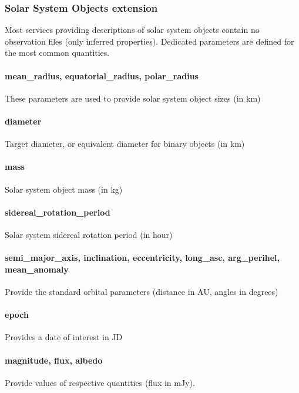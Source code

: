 \documentclass[11pt,a4paper]{ivoa}
\begin{document}
\subsubsection{Solar System Objects extension}

Most services providing descriptions of solar system objects contain
no observation files (only inferred properties).
Dedicated parameters are defined for the most common quantities.

\paragraph{mean\_radius, equatorial\_radius, polar\_radius}

These parameters are used to provide solar system object sizes (in km)

\paragraph{diameter}

Target diameter, or equivalent diameter for binary objects (in km)

\paragraph{mass}

Solar system object mass (in kg)

\paragraph{sidereal\_rotation\_period}

Solar system sidereal rotation period (in hour)

\paragraph{semi\_major\_axis, inclination, eccentricity, long\_asc, arg\_perihel, mean\_anomaly}

Provide the standard orbital parameters (distance in AU, angles in degrees)

\paragraph{epoch}

Provides a date of interest in JD

\paragraph{magnitude, flux, albedo}
Provide values of respective quantities (flux in mJy).
\end{document}
